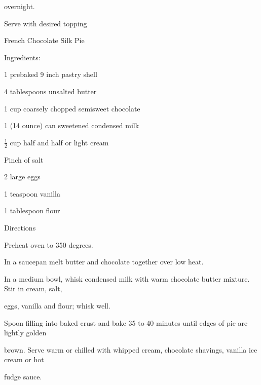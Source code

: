 \documentclass[a4paper,portrait,12pt]{book}
\begin{document}
overnight.




Serve with desired topping







\newpage
French Chocolate Silk Pie




Ingredients:




1 prebaked 9 inch pastry shell




4 tablespoons unsalted butter




1 cup coarsely chopped semisweet chocolate




1 (14 ounce) can sweetened condensed milk




$\frac{1}{2}$ cup half and half or light cream




Pinch of salt




2 large eggs




1 teaspoon vanilla




1 tablespoon flour




Directions




Preheat oven to 350 degrees.




In a saucepan melt butter and chocolate together over low heat.




In a medium bowl, whisk condensed milk with warm chocolate butter mixture. Stir in cream, salt,




eggs, vanilla and flour; whisk well.




Spoon filling into baked crust and bake 35 to 40 minutes until edges of pie are lightly golden




brown. Serve warm or chilled with whipped cream, chocolate shavings, vanilla ice cream or hot




fudge sauce.
\end{document}
